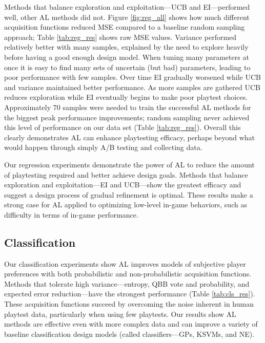 \documentclass{sig-alternate}
\begin{document}
Methods that balance exploration and exploitation---UCB and EI---performed well, other AL methods did not.
Figure \ref{fig:reg_all} shows how much different acquisition functions reduced MSE compared to a baseline random sampling approach; Table \ref{tab:reg_res} shows raw MSE values.
Variance performed relatively better with many samples, explained by the need to explore heavily before having a good enough design model.
When tuning many parameters at once it is easy to find many sets of uncertain (but bad) parameters, leading to poor performance with few samples.
Over time EI gradually worsened while UCB and variance maintained better performance.
As more samples are gathered UCB reduces exploration while EI eventually begins to make poor playtest choices.
Approximately 70 samples were needed to train the successful AL methods for the biggest peak performance improvements; random sampling never achieved this level of performance on our data set (Table \ref{tab:reg_res}).
Overall this clearly demonstrates AL can enhance playtesting efficacy, perhaps beyond what would happen through simply A/B testing and collecting data.

Our regression experiments demonstrate the power of AL to reduce the amount of playtesting required and better achieve design goals.
Methods that balance exploration and exploitation---EI and UCB---show the greatest efficacy and suggest a design process of gradual refinement is optimal.
These results make a strong case for AL applied to optimizing low-level in-game behaviors, such as difficulty in terms of in-game performance.


\subsection{Classification}
Our classification experiments show AL improves models of subjective player preferences with both probabilistic and non-probabilistic acquisition functions.
Methods that tolerate high variance---entropy, QBB vote and probability, and expected error reduction---have the strongest performance (Table \ref{tab:cls_res}).
These acquisition functions succeed by overcoming the noise inherent in human playtest data, particularly when using few playtests.
Our results show AL methods are effective even with more complex data and can improve a variety of baseline classification design models (called classifiers---GPs, KSVMs, and NE).
\end{document}
